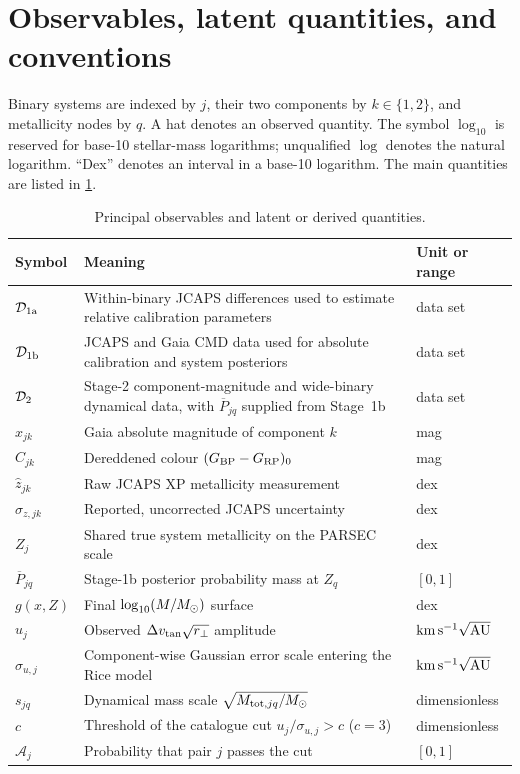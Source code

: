 \section{Observables, latent quantities, and conventions}
\label{sec:notation}

Binary systems are indexed by $j$, their two components by $k\in\{1,2\}$,
and metallicity nodes by $q$.  A hat denotes an observed quantity.  The symbol
$\log_{10}$ is reserved for base-10 stellar-mass logarithms; unqualified
$\log$ denotes the natural logarithm.  ``Dex'' denotes an interval in a
base-10 logarithm.  The main quantities are listed in \cref{tab:notation}.

\begin{table}[htbp]
\centering
\caption{Principal observables and latent or derived quantities.}
\label{tab:notation}
\begin{tabularx}{\textwidth}{@{}lXl@{}}
\toprule
Symbol & Meaning & Unit or range \\
\midrule
$\mathcal D_{\rm 1a}$ & Within-binary JCAPS differences used to estimate relative calibration parameters & data set \\
$\mathcal D_{\rm 1b}$ & JCAPS and Gaia CMD data used for absolute calibration and system posteriors & data set \\
$\mathcal D_{\rm 2}$ & Stage-2 component-magnitude and wide-binary dynamical data, with $\overline P_{jq}$ supplied from Stage~1b & data set \\
$x_{jk}$ & Gaia absolute magnitude of component $k$ & mag \\
$C_{jk}$ & Dereddened colour $(G_{\rm BP}-G_{\rm RP})_0$ & mag \\
$\widehat z_{jk}$ & Raw JCAPS XP metallicity measurement & dex \\
$\sigma_{z,jk}$ & Reported, uncorrected JCAPS uncertainty & dex \\
$Z_j$ & Shared true system metallicity on the PARSEC scale & dex \\
$\overline P_{jq}$ & Stage-1b posterior probability mass at $Z_q$ & $[0,1]$ \\
$g(x,Z)$ & Final $\log_{10}(M/M_{\odot})$ surface & dex \\
$u_j$ & Observed $\Delta v_{\rm tan}\sqrt{r_\perp}$ amplitude & $\mathrm{km}\,\mathrm{s}^{-1}\sqrt{\mathrm{AU}}$ \\
$\sigma_{u,j}$ & Component-wise Gaussian error scale entering the Rice model & $\mathrm{km}\,\mathrm{s}^{-1}\sqrt{\mathrm{AU}}$ \\
$s_{jq}$ & Dynamical mass scale $\sqrt{M_{{\rm tot},jq}/M_{\odot}}$ & dimensionless \\
$c$ & Threshold of the catalogue cut $u_j/\sigma_{u,j}>c$ ($c=3$) & dimensionless \\
$\mathcal A_j$ & Probability that pair $j$ passes the cut & $[0,1]$ \\
\bottomrule
\end{tabularx}
\end{table}
\FloatBarrier

